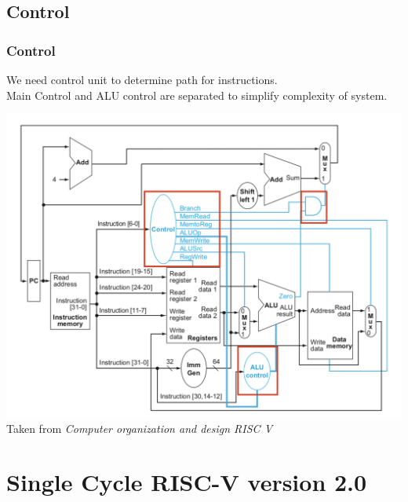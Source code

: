 \documentclass{beamer}
\begin{document}
    \begin{frame}
        \subsection{Control}
        \frametitle{Control}
        \centering
        \vspace{-0.5cm}
        We need control unit to determine path for instructions.\\ 
        Main Control and ALU control are separated to simplify complexity of system. 
        
        \includegraphics[scale=0.3]{"Pictures and plots/control"} \\
        \scriptsize{Taken from \textit{Computer organization and design RISC V}}
        
    \end{frame}

    \section{Single Cycle RISC-V version 2.0}
    
\end{document}

